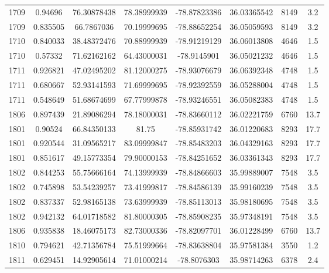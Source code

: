 \documentclass[11pt]{article}
\begin{document}
\begin{longtable*}{|c|c|c|c|c|c|c|c|}
1709  & 0.94696        & 76.30878438       & 78.38999939    & -78.87823386 & 36.03365542 & 8149       & 3.2  \\
1709  & 0.835505       & 66.7867036        & 70.19999695    & -78.88652254 & 36.05059593 & 8149       & 3.2  \\
1710  & 0.840033       & 38.48372476       & 70.88999939    & -78.91219129 & 36.06013808 & 4646       & 1.5  \\
1710  & 0.57332        & 71.62162162       & 64.43000031    & -78.9145901  & 36.05021232 & 4646       & 1.5  \\
1711  & 0.926821       & 47.02495202       & 81.12000275    & -78.93076679 & 36.06392348 & 4748       & 1.5  \\
1711  & 0.680667       & 52.93141593       & 71.69999695    & -78.92392559 & 36.05288004 & 4748       & 1.5  \\
1711  & 0.548649       & 51.68674699       & 67.77999878    & -78.93246551 & 36.05082383 & 4748       & 1.5  \\
1806  & 0.897439       & 21.89086294       & 78.18000031    & -78.83660112 & 36.02221759 & 6760       & 13.7 \\
1801  & 0.90524        & 66.84350133       & 81.75          & -78.85931742 & 36.01220683 & 8293       & 17.7 \\
1801  & 0.920544       & 31.09565217       & 83.09999847    & -78.85483203 & 36.04329163 & 8293       & 17.7 \\
1801  & 0.851617       & 49.15773354       & 79.90000153    & -78.84251652 & 36.03361343 & 8293       & 17.7 \\
1802  & 0.844253       & 55.75666164       & 74.13999939    & -78.84866603 & 35.99889007 & 7548       & 3.5  \\
1802  & 0.745898       & 53.54239257       & 73.41999817    & -78.84586139 & 35.99160239 & 7548       & 3.5  \\
1802  & 0.837337       & 52.98165138       & 73.63999939    & -78.85113013 & 35.98180695 & 7548       & 3.5  \\
1802  & 0.942132       & 64.01718582       & 81.80000305    & -78.85908235 & 35.97348191 & 7548       & 3.5  \\
1806  & 0.935838       & 18.46075173       & 82.73000336    & -78.82097701 & 36.01228499 & 6760       & 13.7 \\
1810  & 0.794621       & 42.71356784       & 75.51999664    & -78.83638804 & 35.97581384 & 3550       & 1.2  \\
1811  & 0.629451       & 14.92905614       & 71.01000214    & -78.8076303  & 35.98714263 & 6378       & 2.4  \\

\end{longtable*}
\end{document}
